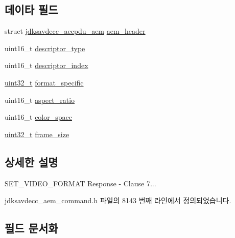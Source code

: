 \subsection*{데이타 필드}
\begin{DoxyCompactItemize}
\item 
struct \hyperlink{structjdksavdecc__aecpdu__aem}{jdksavdecc\+\_\+aecpdu\+\_\+aem} \hyperlink{structjdksavdecc__aem__command__set__video__format__response_ae1e77ccb75ff5021ad923221eab38294}{aem\+\_\+header}
\item 
uint16\+\_\+t \hyperlink{structjdksavdecc__aem__command__set__video__format__response_ab7c32b6c7131c13d4ea3b7ee2f09b78d}{descriptor\+\_\+type}
\item 
uint16\+\_\+t \hyperlink{structjdksavdecc__aem__command__set__video__format__response_a042bbc76d835b82d27c1932431ee38d4}{descriptor\+\_\+index}
\item 
\hyperlink{parse_8c_a6eb1e68cc391dd753bc8ce896dbb8315}{uint32\+\_\+t} \hyperlink{structjdksavdecc__aem__command__set__video__format__response_acbfc36b550978f88cf0a3d9d2b2ce0dd}{format\+\_\+specific}
\item 
uint16\+\_\+t \hyperlink{structjdksavdecc__aem__command__set__video__format__response_aa2976b5991e88ce43c451d2683d5f329}{aspect\+\_\+ratio}
\item 
uint16\+\_\+t \hyperlink{structjdksavdecc__aem__command__set__video__format__response_a5f1234a863bb834ff7c110509884d228}{color\+\_\+space}
\item 
\hyperlink{parse_8c_a6eb1e68cc391dd753bc8ce896dbb8315}{uint32\+\_\+t} \hyperlink{structjdksavdecc__aem__command__set__video__format__response_a0229abcfe4414f86dcf52c5ebf84311c}{frame\+\_\+size}
\end{DoxyCompactItemize}


\subsection{상세한 설명}
S\+E\+T\+\_\+\+V\+I\+D\+E\+O\+\_\+\+F\+O\+R\+M\+AT Response -\/ Clause 7... 

jdksavdecc\+\_\+aem\+\_\+command.\+h 파일의 8143 번째 라인에서 정의되었습니다.



\subsection{필드 문서화}
